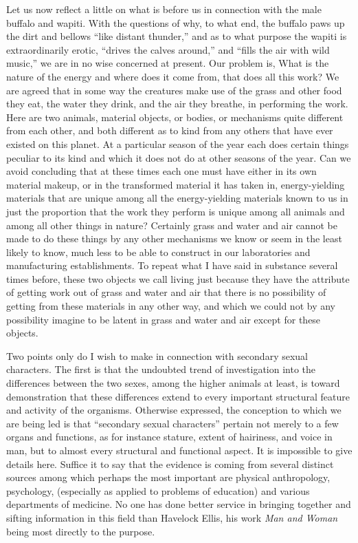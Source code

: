 \documentclass[a4paper, 11pt, oneside, polutonikogreek, english, landscape]{article}
\begin{document}
Let us now reflect a little on what is before us in connection with the male buffalo and wapiti. With the questions of why, to what end, the buffalo paws up the dirt and bellows ``like distant thunder,'' and as to what purpose the wapiti is extraordinarily erotic, ``drives the calves around,'' and ``fills the air with wild music,'' we are in no wise concerned at present. Our problem is, What is the nature of the energy and where does it come from, that does all this work? We are agreed that in some way the creatures make use of the grass and other food they eat, the water they drink, and the air they breathe, in performing the work. Here are two animals, material objects, or bodies, or mechanisms quite different from each other, and both different as to kind from any others that have ever existed on this planet. At a particular season of the year each does certain things peculiar to its kind and which it does not do at other seasons of the year. Can we avoid concluding that at these times each one must have either in its own material makeup, or in the transformed material it has taken in, energy-yielding materials that are unique among all the energy-yielding materials known to us in just the proportion that the work they perform is unique among all animals and among all other things in nature? Certainly grass and water and air cannot be made to do these things by any other mechanisms we know or seem in the least likely to know, much less to be able to construct in our laboratories and manufacturing establishments. To repeat what I have said in substance several times before, these two objects we call living just because they have the attribute of getting work out of grass and water and air that there is no possibility of getting from these materials in any other way, and which we could not by any possibility imagine to be latent in grass and water and air except for these objects.

Two points only do I wish to make in connection with secondary sexual characters. The first is that the undoubted trend of investigation into the differences between the two sexes, among the higher animals at least, is toward demonstration that these differences extend to every important structural feature and activity of the organisms. Otherwise expressed, the conception to which we are being led is that ``secondary sexual characters'' pertain not merely to a few organs and functions, as for instance stature, extent of hairiness, and voice in man, but to almost every structural and functional aspect. It is impossible to give details here. Suffice it to say that the evidence is coming from several distinct sources among which perhaps the most important are physical anthropology, psychology, (especially as applied to problems of education) and various departments of medicine. No one has done better service in bringing together and sifting information in this field than Havelock Ellis, his work \emph{Man and Woman} being most directly to the purpose.
\end{document}
